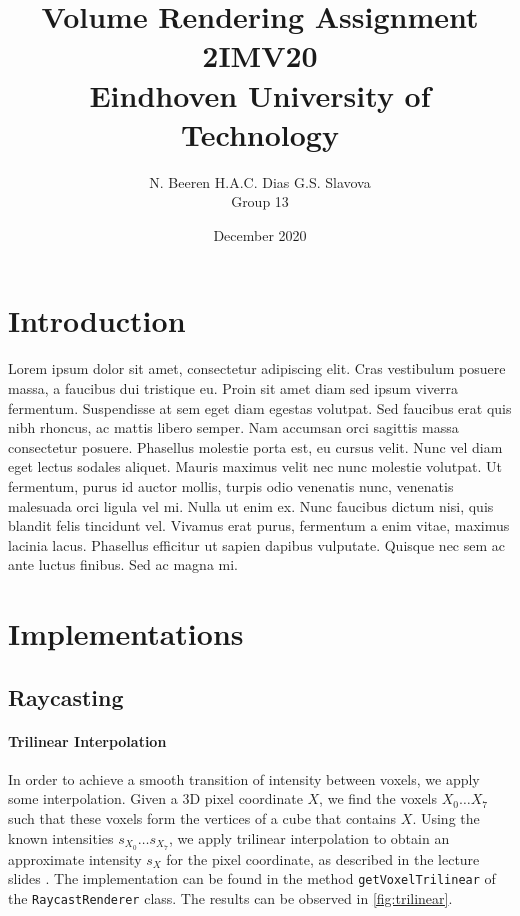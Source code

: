 \documentclass[a4paper]{article}
\title{Volume Rendering Assignment\\2IMV20\\Eindhoven University of Technology}
\author{N. Beeren \quad H.A.C. Dias \quad G.S. Slavova\\Group 13}
\date{December 2020}
\begin{document}
\maketitle

\section{Introduction}


Lorem ipsum dolor sit amet, consectetur adipiscing elit. Cras vestibulum posuere massa, a faucibus dui tristique eu. Proin sit amet diam sed ipsum viverra fermentum. Suspendisse at sem eget diam egestas volutpat. Sed faucibus erat quis nibh rhoncus, ac mattis libero semper. Nam accumsan orci sagittis massa consectetur posuere. Phasellus molestie porta est, eu cursus velit. Nunc vel diam eget lectus sodales aliquet. Mauris maximus velit nec nunc molestie volutpat. Ut fermentum, purus id auctor mollis, turpis odio venenatis nunc, venenatis malesuada orci ligula vel mi. Nulla ut enim ex. Nunc faucibus dictum nisi, quis blandit felis tincidunt vel. Vivamus erat purus, fermentum a enim vitae, maximus lacinia lacus. Phasellus efficitur ut sapien dapibus vulputate. Quisque nec sem ac ante luctus finibus. Sed ac magna mi.

\section{Implementations}

\subsection{Raycasting}

\paragraph{Trilinear Interpolation}
\label{trilinear_interpolation}

In order to achieve a smooth transition of intensity between voxels, we apply some interpolation. Given a 3D pixel coordinate $X$, we find the voxels $X_0 \ldots X_7$ such that these voxels form the vertices of a cube that contains $X$. Using the known intensities $s_{X_0}\ldots s_{X_7}$, we apply trilinear interpolation to obtain an approximate intensity $s_X$ for the pixel coordinate, as described in the lecture slides \citep{2imv20_2}. The implementation can be found in the method {\tt getVoxelTrilinear} of the {\tt RaycastRenderer} class. The results can be observed in \autoref{fig:trilinear}.
\end{document}
